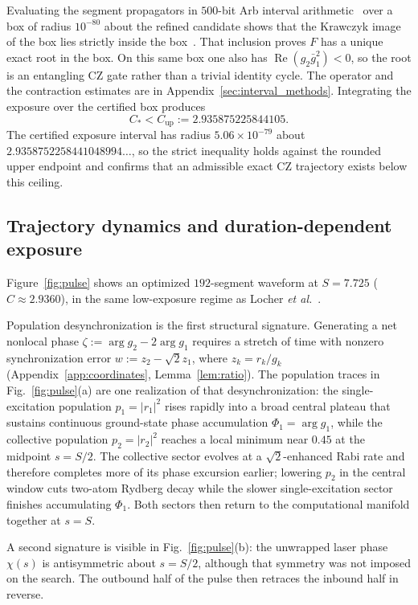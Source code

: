 \documentclass[aps,prx,reprint,nofootinbib,longbibliography,floatfix]{revtex4-2}
\theoremstyle{plain}
\theoremstyle{remark}
\begin{document}
Evaluating the segment propagators in $500$-bit Arb interval arithmetic~\cite{Johansson17} over a box of radius $10^{-80}$ about the refined candidate shows that the Krawczyk image of the box lies strictly inside the box~\cite{Krawczyk69}. That inclusion proves $F$ has a unique exact root in the box. On this same box one also has $\operatorname{Re}(g_2\bar g_1^2)<0$, so the root is an entangling CZ gate rather than a trivial identity cycle. The operator and the contraction estimates are in Appendix~\ref{sec:interval_methods}. Integrating the exposure over the certified box produces
\begin{equation}
C_* < C_{\mathrm{up}} := 2.935875225844105.
\label{eq:upper_bound}
\end{equation}
The certified exposure interval has radius $5.06\times10^{-79}$ about $2.9358752258441048994\ldots$, so the strict inequality holds against the rounded upper endpoint and confirms that an admissible exact CZ trajectory exists below this ceiling.

\subsection{Trajectory dynamics and duration-dependent exposure}
\label{sec:exposure_dynamics}
Figure~\ref{fig:pulse} shows an optimized $192$-segment waveform at $S=7.725$ ($C\approx2.9360$), in the same low-exposure regime as Locher \emph{et al.}~\cite{Locher25}.

Population desynchronization is the first structural signature. Generating a net nonlocal phase $\zeta:=\arg g_2-2\arg g_1$ requires a stretch of time with nonzero synchronization error $w:=z_2-\sqrt{2}z_1$, where $z_k=r_k/g_k$ (Appendix~\ref{app:coordinates}, Lemma~\ref{lem:ratio}). The population traces in Fig.~\ref{fig:pulse}(a) are one realization of that desynchronization: the single-excitation population $p_1=|r_1|^2$ rises rapidly into a broad central plateau that sustains continuous ground-state phase accumulation $\Phi_1=\arg g_1$, while the collective population $p_2=|r_2|^2$ reaches a local minimum near $0.45$ at the midpoint $s=S/2$. The collective sector evolves at a $\sqrt{2}$-enhanced Rabi rate and therefore completes more of its phase excursion earlier; lowering $p_2$ in the central window cuts two-atom Rydberg decay while the slower single-excitation sector finishes accumulating $\Phi_1$. Both sectors then return to the computational manifold together at $s=S$.

A second signature is visible in Fig.~\ref{fig:pulse}(b): the unwrapped laser phase $\chi(s)$ is antisymmetric about $s=S/2$, although that symmetry was not imposed on the search. The outbound half of the pulse then retraces the inbound half in reverse.
\end{document}
